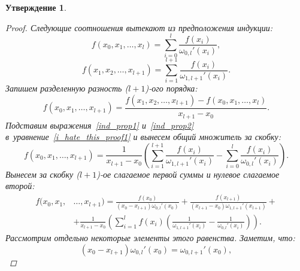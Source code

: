 \documentclass[11pt,a4paper,twoside]{report}
\numberwithin{equation}{section}
\newtheorem*{statement}{Утверждение}
\theoremstyle{definition}
\theoremstyle{plain}
\begin{document}
\begin{statement}
\begin{proof}
        Следующие соотношения вытекают из предположения индукции:
        \begin{equation}
            \label{ind_prop1}
            f(x_0, x_1, \ldots, x_l)=\sum_{i=0}^{l}{\frac{f(x_i)}
            {\omega_{0,l}'(x_i)}},
        \end{equation}
        \begin{equation}
            \label{ind_prop2}
            f(x_1, x_2, \ldots, x_{l+1})=\sum_{i=1}^{l+1}{\frac{f(x_i)}
            {\omega_{1,l+1}'(x_i)}}.
        \end{equation}
        Запишем разделенную разность ($l+1$)-ого порядка:
        \begin{equation}
            \label{i_hate_this_proof1}
            f(x_0, x_1, \ldots, x_{l+1})=\frac{f(x_1, x_2, \ldots, x_{l+1})-
            f(x_0, x_1, \ldots, x_l)}{x_{l+1} - x_0}.
        \end{equation}
        Подставим выражения~\eqref{ind_prop1} и~\eqref{ind_prop2}
        в~уравнение~\eqref{i_hate_this_proof1} и вынесем общий множитель
        за скобку:
        $$
            f(x_0, x_1, \ldots, x_{l+1})=\frac{1}{x_{l+1}-x_0}
            \left(\sum_{i=1}^{l+1}{\frac{f(x_i)}
            {\omega_{1,l+1}'(x_i)}}-\sum_{i=0}^{l}{\frac{f(x_i)}
            {\omega_{0,l}'(x_i)}} \right).
        $$
        Вынесем за скобку ($l+1$)-ое слагаемое первой суммы и нулевое слагаемое
        второй:
        \begin{equation}
            \begin{split}
                \label{i_hate_this_proof3}
             f(x_0, x_1, &\ldots, x_{l+1}) = \frac{f(x_0)}{(x_0-x_{l+1})
             \omega_{0,l}'(x_0)} +
             \frac{f(x_{l+1})}{(x_{l+1}-x_{0})\omega_{1,l+1}'(x_{l+1})} +\\
             &+ \frac{1}{x_{l+1}-x_0}\left(\sum_{i=1}^{l}{f(x_i) \left(
             \frac{1}{\omega_{1,l+1}'(x_i)} -
             \frac{1}{\omega_{0,l}'(x_i)}\right)}\right).
            \end{split}
        \end{equation}
        Рассмотрим отдельно некоторые элементы этого равенства. Заметим, что:
        $$
            (x_0-x_{l+1})\omega_{0,l}'(x_0)=\omega_{0,l+1}'(x_0),
$$
\end{proof}
\end{statement}
\end{document}
